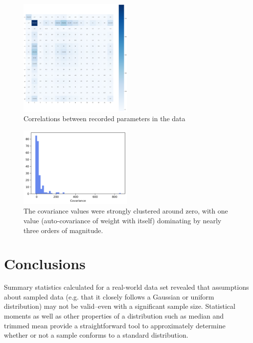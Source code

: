 \documentclass{IEEEtran}
\begin{document}
\begin{centering}
\begin{figure}
\centering
\begin{center}
	\includegraphics[width=0.5\textwidth]{covariance_heatmap}
	\caption{Correlations between recorded parameters in the data\label{fig:cov_heatmap}}
\end{center}
\end{figure}
\end{centering}

\begin{centering}
\begin{figure}
\centering
\begin{center}
	\includegraphics[width=0.5\textwidth]{covariance_dist}
	\caption{The covariance values were strongly clustered around zero, with one value (auto-covariance of weight with itself) dominating by nearly three orders of magnitude.\label{fig:cov_hist}}
\end{center}
\end{figure}
\end{centering}

\section{Conclusions}
Summary statistics calculated for a real-world data set revealed that assumptions about sampled data (e.g. that it closely follows a Gaussian or uniform distribution) may not be valid--even with a significant sample size. Statistical moments as well as other properties of a distribution such as median and trimmed mean provide a straightforward tool to approximately determine whether or not a sample conforms to a standard distribution.
\end{document}
